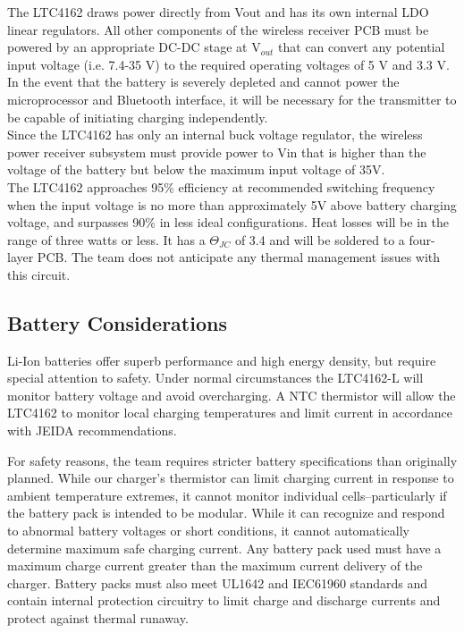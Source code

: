 \documentclass[12pt]{article}
\begin{document}
\indent
The LTC4162 draws power directly from Vout and has its own internal LDO linear regulators. All other components of the wireless receiver PCB must be powered by an appropriate DC-DC stage at V$_{out}$ that can convert any potential input voltage (i.e. 7.4-35 V) to the required operating voltages of 5 V and 3.3 V. In the event that the battery is severely depleted and cannot power the microprocessor and Bluetooth interface, it will be necessary for the transmitter to be capable of initiating charging independently.\\

\indent
Since the LTC4162 has only an internal buck voltage regulator, the wireless power receiver subsystem must provide power to Vin that is higher than the voltage of the battery but below the maximum input voltage of 35V.\\

\indent
The LTC4162 approaches 95\% efficiency at recommended switching frequency when the input voltage is no more than approximately 5V above battery charging voltage, and surpasses 90\% in less ideal configurations. Heat losses will be in the range of three watts or less. It has a $\Theta_{JC}$ of 3.4  and will be soldered to a four-layer PCB. The team does not anticipate any thermal management issues with this circuit.

\subsection{Battery Considerations}
\indent
Li-Ion batteries offer superb performance and high energy density, but require special attention to safety. Under normal circumstances the LTC4162-L will monitor battery voltage and avoid overcharging. A NTC thermistor will allow the LTC4162 to monitor local charging temperatures and limit current in accordance with JEIDA recommendations.\\

\pagebreak

\indent
For safety reasons, the team requires stricter battery specifications than originally planned. While our charger’s thermistor can limit charging current in response to ambient temperature extremes, it cannot monitor individual cells--particularly if the battery pack is intended to be modular. While it can recognize and respond to abnormal battery voltages or short conditions, it cannot automatically determine maximum safe charging current. Any battery pack used must have a maximum charge current greater than the maximum current delivery of the charger. Battery packs must also meet UL1642 and IEC61960 standards and contain internal protection circuitry to limit charge and discharge currents and protect against thermal runaway.\\
\end{document}
